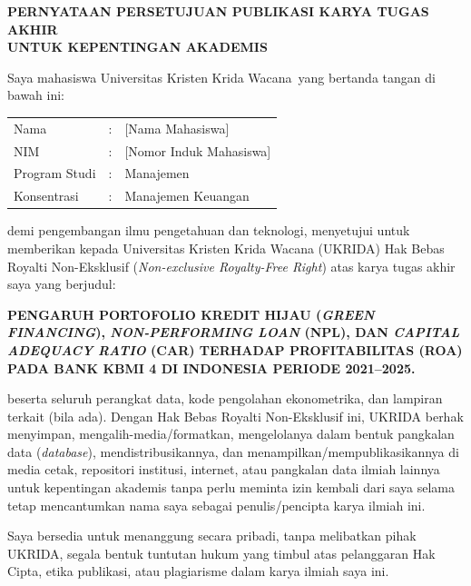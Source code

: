 \documentclass[12pt,a4paper]{article}
\newcommand{\ukrida}{Universitas Kristen Krida Wacana}
\newcommand{\prodi}{Manajemen}
\newcommand{\nahamahasiswa}{[Nama Mahasiswa]}
\newcommand{\nim}{[Nomor Induk Mahasiswa]}
\numberwithin{equation}{section}
\begin{document}
\newpage
\thispagestyle{frontmatter}
\begin{center}
  {\large\bfseries PERNYATAAN PERSETUJUAN PUBLIKASI KARYA TUGAS AKHIR}\\[0.3cm]
  {\large\bfseries UNTUK KEPENTINGAN AKADEMIS}
\end{center}

\vspace{0.8cm}
\noindent Saya mahasiswa \ukrida\ yang bertanda tangan di bawah ini:

\vspace{0.5cm}
\noindent
\begin{tabular}{lll}
  Nama          & : & \nahamahasiswa \\
  NIM           & : & \nim \\
  Program Studi & : & \prodi \\
  Konsentrasi   & : & Manajemen Keuangan \\
\end{tabular}

\vspace{0.5cm}
\noindent
demi pengembangan ilmu pengetahuan dan teknologi, menyetujui untuk memberikan kepada Universitas Kristen Krida Wacana (UKRIDA) Hak Bebas Royalti Non-Eksklusif (\emph{Non-exclusive Royalty-Free Right}) atas karya tugas akhir saya yang berjudul:

\vspace{0.3cm}
\noindent
\textbf{PENGARUH PORTOFOLIO KREDIT HIJAU (\emph{GREEN FINANCING}), \emph{NON-PERFORMING LOAN} (NPL), DAN \emph{CAPITAL ADEQUACY RATIO} (CAR) TERHADAP PROFITABILITAS (ROA) PADA BANK KBMI 4 DI INDONESIA PERIODE 2021--2025.}

\vspace{0.5cm}
\noindent
beserta seluruh perangkat data, kode pengolahan ekonometrika, dan lampiran terkait (bila ada). Dengan Hak Bebas Royalti Non-Eksklusif ini, UKRIDA berhak menyimpan, mengalih-media/formatkan, mengelolanya dalam bentuk pangkalan data (\emph{database}), mendistribusikannya, dan menampilkan/mempublikasikannya di media cetak, repositori institusi, internet, atau pangkalan data ilmiah lainnya untuk kepentingan akademis tanpa perlu meminta izin kembali dari saya selama tetap mencantumkan nama saya sebagai penulis/pencipta karya ilmiah ini.

\vspace{0.3cm}
\noindent
Saya bersedia untuk menanggung secara pribadi, tanpa melibatkan pihak UKRIDA, segala bentuk tuntutan hukum yang timbul atas pelanggaran Hak Cipta, etika publikasi, atau plagiarisme dalam karya ilmiah saya ini.
\end{document}
